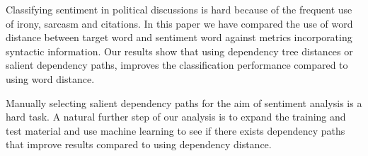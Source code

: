 \documentclass[11pt]{article}
\begin{document}
Classifying sentiment in political discussions is hard because of the frequent use of irony, sarcasm and citations. In this paper we have compared the use of word distance between target word and sentiment word against metrics incorporating syntactic information. Our results show that using dependency tree distances or salient dependency paths, improves the classification performance compared to using word distance. 

Manually selecting salient dependency paths for the aim of sentiment analysis is a hard task. A natural further step of our analysis is to expand the training and test material and use machine learning to see if there exists dependency paths that improve results compared to using dependency distance.


\end{document}
